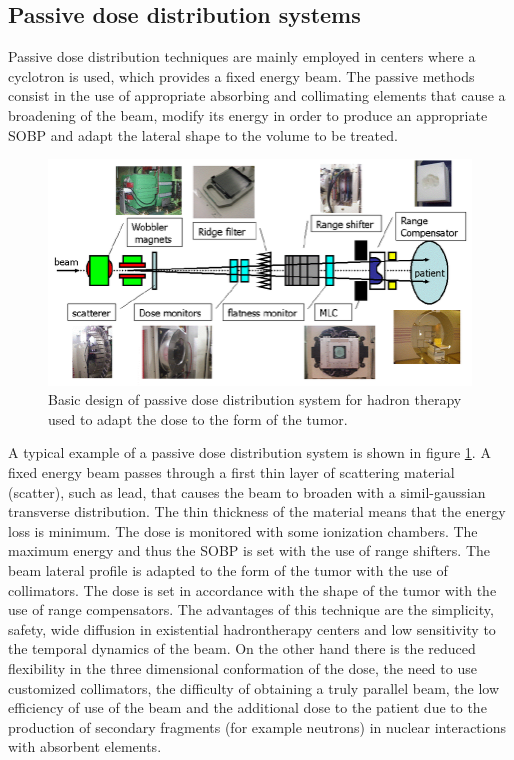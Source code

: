 \subsection{Passive dose distribution systems}
\noindent Passive dose distribution techniques are mainly employed in centers where a cyclotron is used, which provides a fixed energy beam.
The passive methods consist in the use of appropriate absorbing and collimating elements that cause a broadening of the beam, modify its energy in order to produce an appropriate SOBP and adapt the lateral shape to the volume to be treated.
\begin{figure}[H]
	\centering
	\includegraphics[width=0.9\linewidth]{IMG/ch1/Basic-design-of-irradiation-system-for-hadron-therapy}
	\caption{Basic design of passive dose distribution system for hadron therapy used to adapt the dose to the form of the tumor.}
	\label{fig:passive}
\end{figure}
\noindent A typical example of a passive dose distribution system is shown in figure \ref{fig:passive}.
A fixed energy beam passes through a first thin layer of scattering material (scatter), such as lead, that causes the beam to broaden with a simil-gaussian transverse distribution.
The thin thickness of the material means that the energy loss is minimum.
The dose is monitored with some ionization chambers.
The maximum energy and thus the SOBP is set with the use of range shifters.
The beam lateral profile is adapted to the form of the tumor with the use of collimators.
The dose is set in accordance with the shape of the tumor with the use of range compensators.
\newline
The advantages of this technique are the simplicity, safety, wide diffusion in existential hadrontherapy centers and low sensitivity to the temporal dynamics of the beam. 
On the other hand there is the reduced flexibility in the three dimensional conformation of the dose, the need to use customized collimators, the difficulty of obtaining a truly parallel beam, the low efficiency of use of the beam and the additional dose to the patient due to the production of secondary fragments (for example neutrons) in nuclear interactions with absorbent elements.

